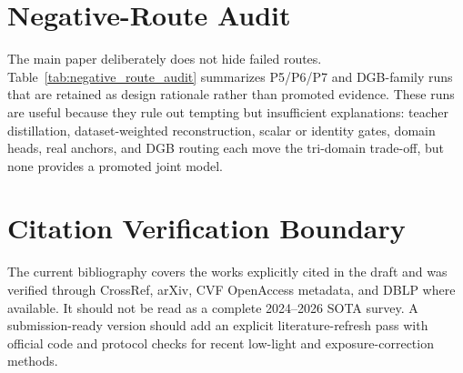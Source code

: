 \appendix
\section{Negative-Route Audit}
\label{app:negative_routes}

The main paper deliberately does not hide failed routes. Table~\ref{tab:negative_route_audit} summarizes P5/P6/P7 and DGB-family runs that are retained as design rationale rather than promoted evidence. These runs are useful because they rule out tempting but insufficient explanations: teacher distillation, dataset-weighted reconstruction, scalar or identity gates, domain heads, real anchors, and DGB routing each move the tri-domain trade-off, but none provides a promoted joint model.





\section{Citation Verification Boundary}
\label{app:citation_boundary}

The current bibliography covers the works explicitly cited in the draft and was verified through CrossRef, arXiv, CVF OpenAccess metadata, and DBLP where available. It should not be read as a complete 2024--2026 SOTA survey. A submission-ready version should add an explicit literature-refresh pass with official code and protocol checks for recent low-light and exposure-correction methods.
